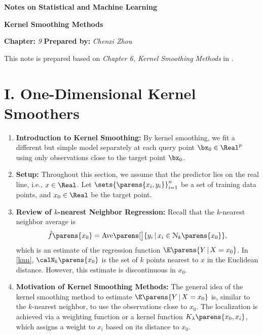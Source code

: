 \documentclass[12pt]{article}
\newcommand{\titlebox}[4]{
\begin{tcolorbox}[colback = blue!5!white!95, colframe = blue!70!black
]
  \noindent \textbf{ #1 } \hfill \textit{#2} 
  \begin{center}
  	 \LARGE{\textbf{#3}}
  \end{center}
\textbf{Chapter:} \textit{#4} \hfill \textbf{Prepared by:} \textit{Chenxi Zhou}
\end{tcolorbox}
}
\begin{document}
\titlebox{Notes on Statistical and Machine Learning}{}{Kernel Smoothing Methods}{9}
\thispagestyle{plain}

\vspace{10pt}

This note is prepared based on \textit{Chapter 6, Kernel Smoothing Methods} in \textcite{Friedman2001-np}. 

\section*{I. One-Dimensional Kernel Smoothers}

\begin{enumerate}[label=\textbf{\arabic*.}]
	
	\item \textbf{Introduction to Kernel Smoothing:} By kernel smoothing, we fit a different but simple model separately at each query point $\bx_0 \in \Real^p$ using only observations close to the target point $\bx_0$. 
	
	
	\item \textbf{Setup:} Throughout this section, we assume that the predictor lies on the real line, i.e., $x \in \Real$. Let $\sets{\parens{x_i, y_i}}_{i=1}^n$ be a set of training data points, and $x_0 \in \Real$ be the target point. 
	
	\item \textbf{Review of $k$-nearest Neighbor Regression:} Recall that the $k$-nearest neighbor average is 
	\begin{align}\label{knn}
		\hat{f} \parens{x_0} = \mathrm{Ave} \parens[\big]{y_i \,\vert\, x_i \in \mathcal{N}_k \parens{x_0}}, 
	\end{align} 
	which is an estimate of the regression function $\E \parens{Y \,\vert\, X = x_0}$. In \eqref{knn}, $\calN_k \parens{x_0}$ is the set of $k$ points nearest to $x$ in the Euclidean distance. However, this estimate is discontinuous in $x_0$. 
	
	\item \textbf{Motivation of Kernel Smoothing Methods:} The general idea of the kernel smoothing method to estimate $\E \parens{Y \,\vert\, X = x_0}$ is, similar to the $k$-nearest neighbor, to use the observations close to $x_0$. The localization is achieved via a weighting function or a kernel function $K_{\lambda} \parens{x_0, x_i}$, which assigns a weight to $x_i$ based on its distance to $x_0$. 
	

\end{enumerate}
\end{document}
